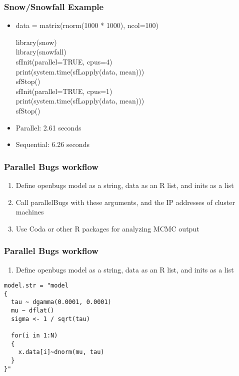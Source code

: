 \documentclass{beamer}
\begin{document}
\begin{frame}
  \frametitle{Snow/Snowfall Example}
  
  \begin{itemize}
  \item
    data = matrix(rnorm(1000 * 1000), ncol=100)
    
    library(snow)\\
    library(snowfall)\\
    sfInit(parallel=TRUE, cpus=4)\\
    print(system.time(sfLapply(data, mean)))\\
    sfStop()\\
    sfInit(parallel=TRUE, cpus=1)\\
    print(system.time(sfLapply(data, mean)))\\
    sfStop()
    \item Parallel: 2.61 seconds
    \item Sequential: 6.26 seconds
  \end{itemize}
\end{frame}

\begin{frame}
  \frametitle{Parallel Bugs workflow}
  
  \begin{enumerate}
    \item Define openbugs model as a string, data as an R list, and inits as a list
    \item Call parallelBugs with these arguments, and the IP addresses of cluster machines
    \item Use Coda or other R packages for analyzing MCMC output
  \end{enumerate}
\end{frame}


\begin{frame}[fragile]
  \frametitle{Parallel Bugs workflow}
  
  \begin{enumerate}
    \item Define openbugs model as a string, data as an R list, and inits as a list
  \end{enumerate}

  \begin{verbatim}
model.str = "model
{
  tau ~ dgamma(0.0001, 0.0001)
  mu ~ dflat()
  sigma <- 1 / sqrt(tau)

  for(i in 1:N)
  {
    x.data[i]~dnorm(mu, tau)
  }
}"
  \end{verbatim}
\end{frame}
\end{document}
